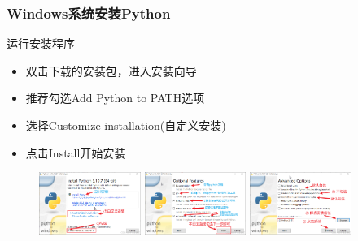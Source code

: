 \begin{frame}
	\frametitle{\textrm{Windows}系统安装\textrm{Python}}
        运行安装程序
            \begin{itemize}
                \item 双击下载的安装包，进入安装向导
		\item 推荐勾选\textrm{Add Python to PATH}选项\\
			{\fontsize{7.2pt}{4.2pt}}
		\item 选择\textrm{Customize installation}(自定义安装)\\
		{\fontsize{7.2pt}{4.2pt}}
		\item 点击\textrm{Install}开始安装
            \end{itemize}
\begin{figure}[h!]
\centering
\includegraphics[height=0.8in, width=1.3in, viewport=0 0 666 410,clip]{Figures/python_install-windows-1.png}
\includegraphics[height=0.8in, width=1.3in, viewport=0 0 666 410,clip]{Figures/python_install-windows-2.png}
\includegraphics[height=0.8in, width=1.3in, viewport=0 0 666 410,clip]{Figures/python_install-windows-3.png}
\label{Python-install_windows}
\end{figure}
\end{frame}

